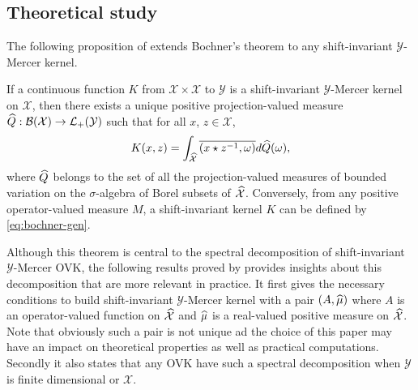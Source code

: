 \subsection{Theoretical study}
The following proposition of \citet{Zhang2012,Carmeli2010} extends Bochner's theorem to any shift-invariant $\mathcal{Y}$-Mercer kernel.
\begin{proposition}\label{eq:bochner-gen}
If a continuous function $K$ from $\mathcal{X} \times \mathcal{X}$ to $\mathcal{Y}$ is a shift-invariant $\mathcal{Y}$-Mercer kernel on $\mathcal{X}$, then there exists a unique positive projection-valued measure $\widehat{Q}: \mathcal{B}(\mathcal{X}) \to \mathcal{L}_+(\mathcal{Y})$ such that for all $x$, $z \in \mathcal{X}$,
\begin{dmath}
K(x, z) = \int_{\dual{\mathcal{X}}} \conj{\pairing{x \groupop \inv{z}, \omega}} d\dual{Q}(\omega),
\end{dmath}
where $\widehat{Q}$ belongs to the set of all the projection-valued measures of bounded variation on the $\sigma$-algebra of Borel subsets of $\widehat{\mathcal{X}}$. Conversely, from any positive operator-valued measure $M$, a shift-invariant kernel $K$ can be defined by \cref{eq:bochner-gen}.
\end{proposition}
Although this theorem is central to the spectral decomposition of shift-invariant $\mathcal{Y}$-Mercer \acs{OVK}, the following results proved by \citet{Carmeli2010} provides insights about this decomposition that are more relevant in practice. It first gives the necessary conditions to build shift-invariant $\mathcal{Y}$-Mercer kernel with  a pair $(A, \widehat{\mu})$ where $A$ is an operator-valued function on $\widehat{\mathcal{X}}$ and $\widehat{\mu}$ is a real-valued positive measure on $\widehat{\mathcal{X}}$. Note that obviously such a pair is not unique ad the choice of this paper may have an impact on theoretical properties as well as practical computations.
Secondly it also states that any \acs{OVK} have such a spectral decomposition when $\mathcal{Y}$ is finite dimensional or $\mathcal{X}$.

